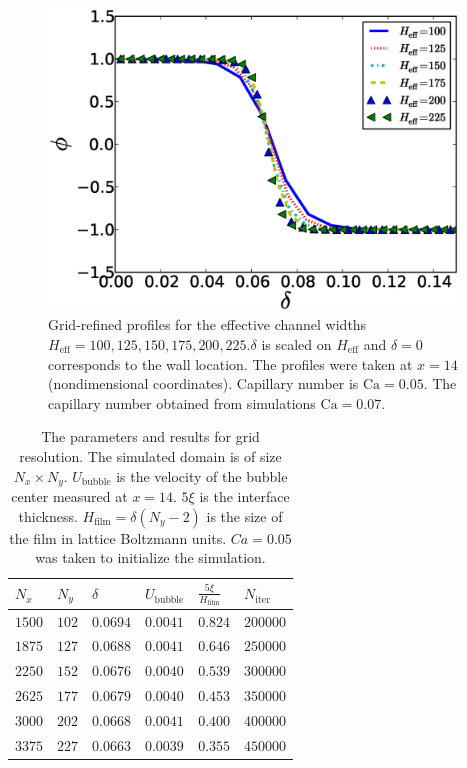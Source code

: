 \documentclass[preprint,12pt]{elsarticle}
\newcommand{\Ca}{\mathrm{Ca}}
\begin{document}
\begin{figure}
\includegraphics[width=0.97\textwidth]{Figures/Grid/norm_grid_profs.eps}
\caption{Grid-refined profiles for the effective
channel widths
$H_{\mathrm{eff}}=100,125,150,175,200,225$.$\delta$ is scaled on $H_\mathrm{eff}$ and $\delta=0$
corresponds to the wall location. The profiles were taken at $x=14$ (nondimensional coordinates).
Capillary number is $\Ca=0.05$. The capillary number obtained from simulations $\Ca=0.07$. 
\label{fig:grid:profiles}}
\end{figure}
\begin{table}
\begin{tabularx}{0.97\textwidth}{|X|X|X|X|X|X|}
\hline
$N_x$&$N_y$&$\delta$&$U_\mathrm{bubble}$&$\frac{5\xi}{H_{\mathrm{film}}}$&$N_\mathrm{iter}$\\
\hline
$1500$&$102$&$0.0694$&$0.0041$&$0.824$&$200000$\\
\hline
$1875$&$127$&$0.0688$&$0.0041$&$0.646$&$250000$\\
\hline
$2250$&$152$&$0.0676$&$0.0040$&$0.539$&$300000$\\
\hline
$2625$&$177$&$0.0679$&$0.0040$&$0.453$&$350000$\\
\hline
$3000$&$202$&$0.0668$&$0.0041$&$0.400$&$400000$\\
\hline
$3375$&$227$&$0.0663$&$0.0039$&$0.355$&$450000$\\
\hline
\end{tabularx}
\caption{The parameters and results for grid resolution. The simulated domain is
of size $N_x \times N_y$. $U_\mathrm{bubble}$ is the velocity of the bubble center measured at
$x=14$.  $5\xi$ is the interface thickness. $H_{\mathrm{film}}=\delta (N_y-2)$ is the size of the film in
lattice Boltzmann units. $Ca=0.05$ was taken to initialize the simulation.
\label{table:parameters:grid:refinement}}
\end{table}
\end{document}
